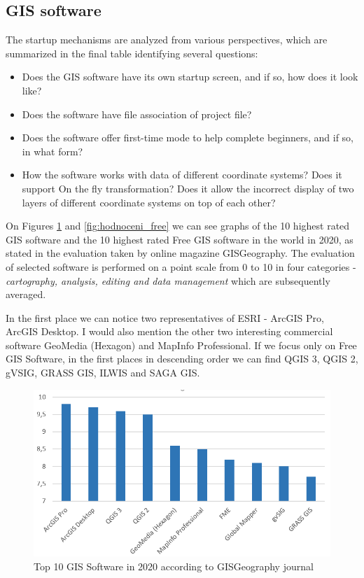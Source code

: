 \documentclass[a4paper,10pt,twoside]{article}
\begin{document}
\subsection{GIS software}
\label{subsection:GIS software}

The startup mechanisms are analyzed from various perspectives, which are summarized in the final table identifying several questions:
\begin{itemize}
\item Does the GIS software have its own startup screen, and if so, how does it look like? 
\item Does the software have file association of project file?
\item Does the software offer first-time mode to help complete beginners, and if so, in what form?
\item How the software works with data of different coordinate systems? Does it support On the fly transformation? Does it allow the incorrect display of two layers of different coordinate systems on top of each other?
\end{itemize}

\noindent On Figures \ref{fig:hodnoceni_all} and  \ref{fig:hodnoceni_free} we can see graphs of the 10 highest rated GIS software and the 10 highest rated Free GIS software in the world in 2020, as stated in the evaluation taken by online magazine GISGeography. The evaluation of selected software is performed on a point scale from 0 to 10 in four categories - \textit{cartography, analysis, editing and data management} which are subsequently averaged. 

In the first place we can notice two representatives of ESRI - ArcGIS Pro, ArcGIS Desktop. I would also mention the other two interesting commercial software GeoMedia (Hexagon) and MapInfo Professional. If we focus only on Free GIS Software, in the first places in descending order we can find QGIS 3, QGIS 2, gVSIG, GRASS GIS, ILWIS and SAGA GIS. 

\vspace{0.3cm}
\begin{figure}[hbt!] 
\begin{center}
\includegraphics[width=12cm]{../pictures/hodnoceni_all.png} 
\caption[Top 10 GIS Software in 2020 according to GISGeography journal]{Top 10 GIS Software in 2020 according to GISGeography journal}
\label{fig:hodnoceni_all}
\end{center}
\end{figure}
\end{document}

